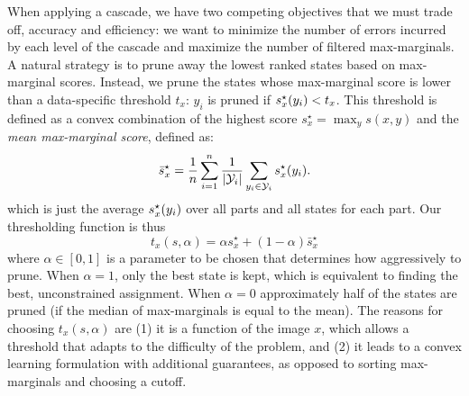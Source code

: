 When applying a cascade, we have two competing objectives that we must trade 
off, accuracy and efficiency: we want to minimize the number of errors incurred 
by each level of the cascade  and maximize the number of filtered 
max-marginals.  A natural strategy is to prune away the lowest ranked states 
based on max-marginal scores. Instead, we prune the states whose max-marginal 
score is lower than a data-specific threshold $t_x$: $y_i$ is pruned if $s^\star_x(y_i) < 
t_x$.  This threshold is defined as a convex combination of the highest score
$s^\star_x = \max_y s(x,y)$ and the {\em mean max-marginal score}, defined as:
\begin{equation}
\bar{s}^\star_x = \frac{1}{n} \sum_{i=1}^n \frac{1}{|\mathcal{Y}_i|} \sum_{y_i \in 
\mathcal{Y}_i} s^\star_x(y_i).
\end{equation}
which is just the average $s^\star_x(y_i)$ over all parts and all states for each part.  Our thresholding function is thus
\begin{equation}
t_x(s,\alpha) = \alpha s^\star_x + (1-\alpha)\bar{s}^\star_x
\end{equation}
where $\alpha\in[0,1]$ is a parameter to be chosen that 
determines how aggressively to prune. When $\alpha = 1$, only the best state is 
kept, which is equivalent to finding the best, unconstrained assignment.  When $\alpha = 0$ 
approximately half of the states are pruned (if the median of max-marginals is 
equal to the mean).  The reasons for choosing $t_x(s,\alpha)$ are (1) it is a 
function of the image $x$, which allows a threshold that adapts to the 
difficulty of the problem, and (2) it leads to a convex learning formulation 
with additional guarantees, as opposed to sorting max-marginals and choosing a 
cutoff.

